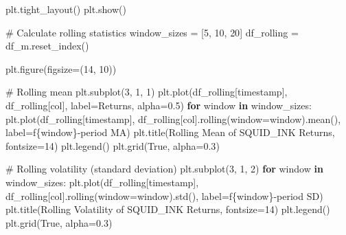 \documentclass[
  letterpaper,
  DIV=11,
  numbers=noendperiod]{scrartcl}
\newenvironment{Shaded}{\begin{snugshade}}{\end{snugshade}}
\newcommand{\CommentTok}[1]{\textcolor[rgb]{0.37,0.37,0.37}{#1}}
\newcommand{\ControlFlowTok}[1]{\textcolor[rgb]{0.00,0.23,0.31}{\textbf{#1}}}
\newcommand{\DecValTok}[1]{\textcolor[rgb]{0.68,0.00,0.00}{#1}}
\newcommand{\FloatTok}[1]{\textcolor[rgb]{0.68,0.00,0.00}{#1}}
\newcommand{\KeywordTok}[1]{\textcolor[rgb]{0.00,0.23,0.31}{\textbf{#1}}}
\newcommand{\NormalTok}[1]{\textcolor[rgb]{0.00,0.23,0.31}{#1}}
\newcommand{\OperatorTok}[1]{\textcolor[rgb]{0.37,0.37,0.37}{#1}}
\newcommand{\SpecialCharTok}[1]{\textcolor[rgb]{0.37,0.37,0.37}{#1}}
\newcommand{\SpecialStringTok}[1]{\textcolor[rgb]{0.13,0.47,0.30}{#1}}
\newcommand{\StringTok}[1]{\textcolor[rgb]{0.13,0.47,0.30}{#1}}
\newcommand{\VariableTok}[1]{\textcolor[rgb]{0.07,0.07,0.07}{#1}}
\begin{document}
\begin{Shaded}
\begin{Highlighting}[]
\NormalTok{    plt.tight\_layout()}
\NormalTok{    plt.show()}

    \CommentTok{\# Calculate rolling statistics}
\NormalTok{    window\_sizes }\OperatorTok{=}\NormalTok{ [}\DecValTok{5}\NormalTok{, }\DecValTok{10}\NormalTok{, }\DecValTok{20}\NormalTok{]}
\NormalTok{    df\_rolling }\OperatorTok{=}\NormalTok{ df\_m.reset\_index()}

\NormalTok{    plt.figure(figsize}\OperatorTok{=}\NormalTok{(}\DecValTok{14}\NormalTok{, }\DecValTok{10}\NormalTok{))}

    \CommentTok{\# Rolling mean}
\NormalTok{    plt.subplot(}\DecValTok{3}\NormalTok{, }\DecValTok{1}\NormalTok{, }\DecValTok{1}\NormalTok{)}
\NormalTok{    plt.plot(df\_rolling[}\StringTok{\textquotesingle{}timestamp\textquotesingle{}}\NormalTok{], df\_rolling[col], label}\OperatorTok{=}\StringTok{\textquotesingle{}Returns\textquotesingle{}}\NormalTok{, alpha}\OperatorTok{=}\FloatTok{0.5}\NormalTok{)}
    \ControlFlowTok{for}\NormalTok{ window }\KeywordTok{in}\NormalTok{ window\_sizes:}
\NormalTok{        plt.plot(df\_rolling[}\StringTok{\textquotesingle{}timestamp\textquotesingle{}}\NormalTok{], }
\NormalTok{                df\_rolling[col].rolling(window}\OperatorTok{=}\NormalTok{window).mean(), }
\NormalTok{                label}\OperatorTok{=}\SpecialStringTok{f\textquotesingle{}}\SpecialCharTok{\{}\NormalTok{window}\SpecialCharTok{\}}\SpecialStringTok{{-}period MA\textquotesingle{}}\NormalTok{)}
\NormalTok{    plt.title(}\StringTok{\textquotesingle{}Rolling Mean of SQUID\_INK Returns\textquotesingle{}}\NormalTok{, fontsize}\OperatorTok{=}\DecValTok{14}\NormalTok{)}
\NormalTok{    plt.legend()}
\NormalTok{    plt.grid(}\VariableTok{True}\NormalTok{, alpha}\OperatorTok{=}\FloatTok{0.3}\NormalTok{)}

    \CommentTok{\# Rolling volatility (standard deviation)}
\NormalTok{    plt.subplot(}\DecValTok{3}\NormalTok{, }\DecValTok{1}\NormalTok{, }\DecValTok{2}\NormalTok{)}
    \ControlFlowTok{for}\NormalTok{ window }\KeywordTok{in}\NormalTok{ window\_sizes:}
\NormalTok{        plt.plot(df\_rolling[}\StringTok{\textquotesingle{}timestamp\textquotesingle{}}\NormalTok{], }
\NormalTok{                df\_rolling[col].rolling(window}\OperatorTok{=}\NormalTok{window).std(), }
\NormalTok{                label}\OperatorTok{=}\SpecialStringTok{f\textquotesingle{}}\SpecialCharTok{\{}\NormalTok{window}\SpecialCharTok{\}}\SpecialStringTok{{-}period SD\textquotesingle{}}\NormalTok{)}
\NormalTok{    plt.title(}\StringTok{\textquotesingle{}Rolling Volatility of SQUID\_INK Returns\textquotesingle{}}\NormalTok{, fontsize}\OperatorTok{=}\DecValTok{14}\NormalTok{)}
\NormalTok{    plt.legend()}
\NormalTok{    plt.grid(}\VariableTok{True}\NormalTok{, alpha}\OperatorTok{=}\FloatTok{0.3}\NormalTok{)}


\end{Highlighting}
\end{Shaded}
\end{document}
